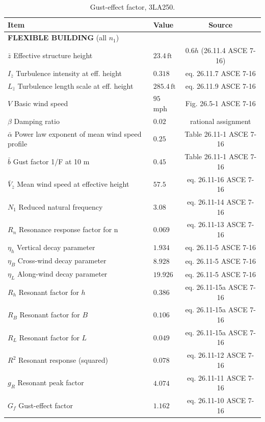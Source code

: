 \documentclass[onecolumn, fleqn]{article}
\newcommand{\ft}{\ensuremath{\,\mathrm{ft}}}
\begin{document}
\begin{table}[H]
\centering \caption{Gust-effect factor, 3LA250.}
\label{tab:gust_factor_3LA250}
\begin{tabular}{llc}
\toprule
Item		& Value		& Source		\\
\midrule
\multicolumn{3}{l}{\textbf{FLEXIBLE BUILDING} (all $n_1$)}	\\
$\bar{z}$ Effective structure height							& $23.4 \ft$					& $0.6h$ (26.11.4 ASCE 7-16)	\\
$I_{\bar{z}}$ Turbulence intensity at eff. height				& $0.318$						& eq. 26.11.7 ASCE 7-16			\\
$L_{\bar{z}}$ Turbulence length scale at eff. height			& $285.4 \ft$					& eq. 26.11.9 ASCE 7-16			\\
$V$ Basic wind speed											& $95$ mph						& Fig. 26.5-1 ASCE 7-16			\\
$\beta$ Damping ratio											& $0.02$						& rational assignment			\\
$\bar{\alpha}$ Power law exponent of mean wind speed profile	& $0.25$						& Table 26.11-1 ASCE 7-16		\\
$\bar{b}$ Gust factor 1/F at 10 m								& $0.45$						& Table 26.11-1 ASCE 7-16		\\
$\bar{V}_{\bar{z}}$ Mean wind speed at effective height			& $57.5$						& eq. 26.11-16 ASCE 7-16		\\
$N_1$ Reduced natural frequency									& $3.08$						& eq. 26.11-14 ASCE 7-16		\\
$R_n$ Resonance response factor for n							& $0.069$						& eq. 26.11-13 ASCE 7-16		\\
$\eta_h$ Vertical decay parameter								& $1.934$						& eq. 26.11-5 ASCE 7-16			\\
$\eta_B$ Cross-wind decay parameter								& $8.928$						& eq. 26.11-5 ASCE 7-16			\\
$\eta_L$ Along-wind decay parameter								& $19.926$						& eq. 26.11-5 ASCE 7-16			\\
$R_h$ Resonant factor for $h$									& $0.386$							& eq. 26.11-15a ASCE 7-16			\\
$R_B$ Resonant factor for $B$									& $0.106$							& eq. 26.11-15a ASCE 7-16			\\
$R_L$ Resonant factor for $L$									& $0.049$							& eq. 26.11-15a ASCE 7-16			\\
$R^2$ Resonant response (squared)								& $0.078$							& eq. 26.11-12 ASCE 7-16			\\
$g_R$ Resonant peak factor										& $4.074$							& eq. 26.11-11 ASCE 7-16			\\
$G_f$ Gust-effect factor										& $1.162$							& eq. 26.11-10 ASCE 7-16			\\
\bottomrule
\end{tabular}
\end{table}
\end{document}
